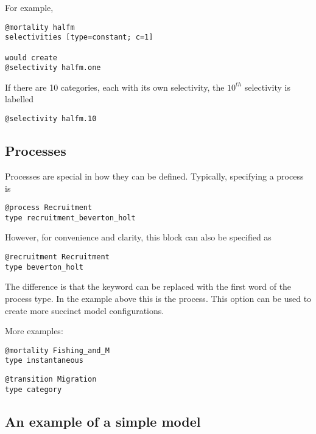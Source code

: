 For example,

{\small{\begin{verbatim}
@mortality halfm
selectivities [type=constant; c=1]

would create
@selectivity halfm.one
\end{verbatim}}}

If there are 10 categories, each with its own selectivity, the $10^{th}$ selectivity is labelled

{\small{\begin{verbatim}
@selectivity halfm.10
\end{verbatim}}}

\subsection{Processes}

Processes are special in how they can be defined. Typically, specifying a process is

{\small{\begin{verbatim}
@process Recruitment
type recruitment_beverton_holt
\end{verbatim}}}

However, for convenience and clarity, this block can also be specified as

{\small{\begin{verbatim}
@recruitment Recruitment
type beverton_holt
\end{verbatim}}}

The difference is that the keyword  can be replaced with the first word of the process type. In the example above this is the  process. This option can be used to create more succinct model configurations.

More examples:

{\small{\begin{verbatim}
@mortality Fishing_and_M
type instantaneous
\end{verbatim}}}

{\small{\begin{verbatim}
@transition Migration
type category
\end{verbatim}}}

\subsection{An example of a simple model\label{example1}}




%

